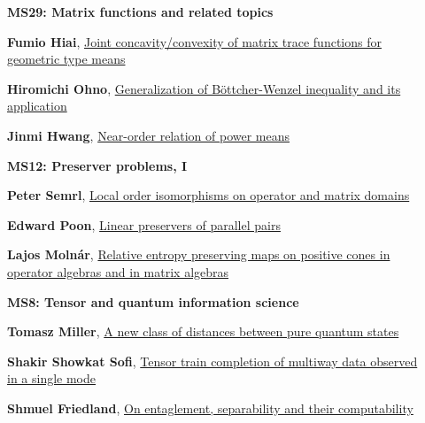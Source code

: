 \documentclass[ILAS2025-program.tex]{subfiles}
\begin{document}
\begin{description}
\begin{description}
    \item[] {\color{mstitle}\textbf{MS29: Matrix functions and related topics}} 
    \item[] \hypertarget{up0013}{}\textbf{Fumio Hiai}, \hyperlink{down0013}{Joint concavity/convexity of matrix trace functions for geometric type means}
        \item[] \hypertarget{up0014}{}\textbf{Hiromichi Ohno}, \hyperlink{down0014}{Generalization of B\"ottcher-Wenzel inequality and its application}
        \item[] \hypertarget{up0015}{}\textbf{Jinmi Hwang}, \hyperlink{down0015}{Near-order relation of power means}
        \end{description}
    \begin{description}
    \item[] {\color{mstitle}\textbf{MS12: Preserver problems, I}} 
    \item[] \hypertarget{up0016}{}\textbf{Peter Semrl}, \hyperlink{down0016}{Local order isomorphisms on operator and matrix domains}
        \item[] \hypertarget{up0017}{}\textbf{Edward Poon}, \hyperlink{down0017}{Linear preservers of parallel pairs}
        \item[] \hypertarget{up0018}{}\textbf{Lajos Molnár}, \hyperlink{down0018}{Relative entropy preserving maps on positive cones in operator algebras and in matrix algebras}
        \end{description}
    \begin{description}
    \item[] {\color{mstitle}\textbf{MS8: Tensor and quantum information science}} 
    \item[] \hypertarget{up0019}{}\textbf{Tomasz Miller}, \hyperlink{down0019}{A new class of distances between pure quantum states}
        \item[] \hypertarget{up0020}{}\textbf{Shakir Showkat Sofi}, \hyperlink{down0020}{Tensor train completion of multiway data observed in a single mode}
        \item[] \hypertarget{up0021}{}\textbf{Shmuel Friedland}, \hyperlink{down0021}{On entaglement, separability and their computability}
        \end{description}

\end{description}
\end{document}
